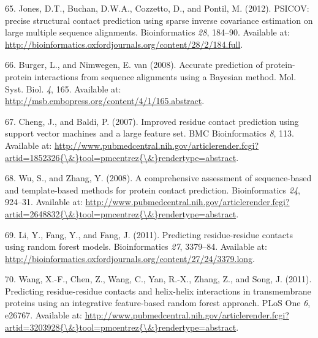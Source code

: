 \documentclass[11pt,a4paper,twoside]{book}
\theoremstyle{definition}
\theoremstyle{definition}
\theoremstyle{remark}
\begin{document}
\hypertarget{ref-Jones2012}{}
65. Jones, D.T., Buchan, D.W.A., Cozzetto, D., and Pontil, M. (2012).
PSICOV: precise structural contact prediction using sparse inverse
covariance estimation on large multiple sequence alignments.
Bioinformatics \emph{28}, 184--90. Available at:
\url{http://bioinformatics.oxfordjournals.org/content/28/2/184.full}.

\hypertarget{ref-Burger2008}{}
66. Burger, L., and Nimwegen, E. van (2008). Accurate prediction of
protein-protein interactions from sequence alignments using a Bayesian
method. Mol. Syst. Biol. \emph{4}, 165. Available at:
\url{http://msb.embopress.org/content/4/1/165.abstract}.

\hypertarget{ref-Cheng2007}{}
67. Cheng, J., and Baldi, P. (2007). Improved residue contact prediction
using support vector machines and a large feature set. BMC
Bioinformatics \emph{8}, 113. Available at:
\href{http://www.pubmedcentral.nih.gov/articlerender.fcgi?artid=1852326\%7B/\&\%7Dtool=pmcentrez\%7B/\&\%7Drendertype=abstract}{http://www.pubmedcentral.nih.gov/articlerender.fcgi?artid=1852326\{\textbackslash{}\&\}tool=pmcentrez\{\textbackslash{}\&\}rendertype=abstract}.

\hypertarget{ref-Wu2008}{}
68. Wu, S., and Zhang, Y. (2008). A comprehensive assessment of
sequence-based and template-based methods for protein contact
prediction. Bioinformatics \emph{24}, 924--31. Available at:
\href{http://www.pubmedcentral.nih.gov/articlerender.fcgi?artid=2648832\%7B/\&\%7Dtool=pmcentrez\%7B/\&\%7Drendertype=abstract}{http://www.pubmedcentral.nih.gov/articlerender.fcgi?artid=2648832\{\textbackslash{}\&\}tool=pmcentrez\{\textbackslash{}\&\}rendertype=abstract}.

\hypertarget{ref-Li2011}{}
69. Li, Y., Fang, Y., and Fang, J. (2011). Predicting residue-residue
contacts using random forest models. Bioinformatics \emph{27}, 3379--84.
Available at:
\url{http://bioinformatics.oxfordjournals.org/content/27/24/3379.long}.

\hypertarget{ref-Wang2011}{}
70. Wang, X.-F., Chen, Z., Wang, C., Yan, R.-X., Zhang, Z., and Song, J.
(2011). Predicting residue-residue contacts and helix-helix interactions
in transmembrane proteins using an integrative feature-based random
forest approach. PLoS One \emph{6}, e26767. Available at:
\href{http://www.pubmedcentral.nih.gov/articlerender.fcgi?artid=3203928\%7B/\&\%7Dtool=pmcentrez\%7B/\&\%7Drendertype=abstract}{http://www.pubmedcentral.nih.gov/articlerender.fcgi?artid=3203928\{\textbackslash{}\&\}tool=pmcentrez\{\textbackslash{}\&\}rendertype=abstract}.
\end{document}
